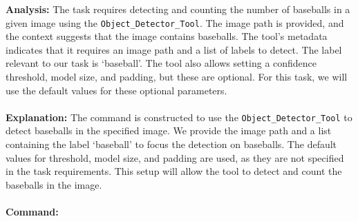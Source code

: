 \begin{executorbox}

\textbf{Analysis:}
The task requires detecting and counting the number of baseballs in a given image using the \texttt{Object\_Detector\_Tool}. The image path is provided, and the context suggests that the image contains baseballs. The tool's metadata indicates that it requires an image path and a list of labels to detect. The label relevant to our task is `baseball'. The tool also allows setting a confidence threshold, model size, and padding, but these are optional. For this task, we will use the default values for these optional parameters.
\\\\
\textbf{Explanation:}
The command is constructed to use the \texttt{Object\_Detector\_Tool} to detect baseballs in the specified image. We provide the image path and a list containing the label `baseball' to focus the detection on baseballs. The default values for threshold, model size, and padding are used, as they are not specified in the task requirements. This setup will allow the tool to detect and count the baseballs in the image.
\\\\
\textbf{Command:}
\end{executorbox}


\begin{executorbox}
\begin{codebox}
\end{codebox}
\end{executorbox}



